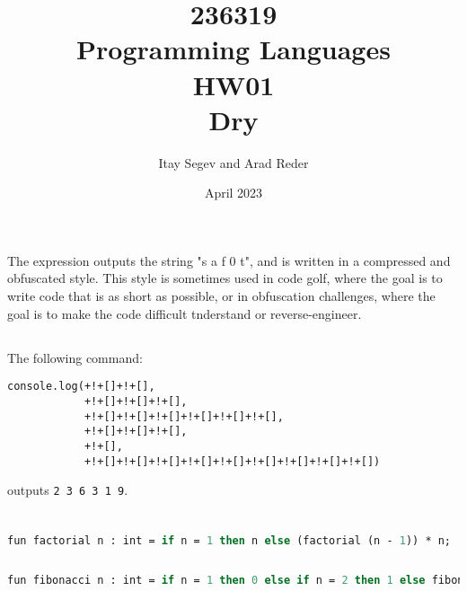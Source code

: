 \documentclass{article}
\title{%
       236319 \\
       Programming Languages \\
       \large HW01 \\
       \small Dry}
\author{Itay Segev and Arad Reder}
\date{April 2023}
\begin{document}
\maketitle

\section{}
\subsection{}
The expression outputs the string "s a f 0 t", and is written in a compressed and obfuscated style. This style is sometimes used in code
golf, where the goal is to write code that is as short as possible, or in obfuscation challenges, where the goal is to make the code difficult
tnderstand or reverse-engineer.
\subsection{}
The following command:
\begin{lstlisting}
console.log(+!+[]+!+[],
            +!+[]+!+[]+!+[],
            +!+[]+!+[]+!+[]+!+[]+!+[]+!+[],
            +!+[]+!+[]+!+[],
            +!+[],
            +!+[]+!+[]+!+[]+!+[]+!+[]+!+[]+!+[]+!+[]+!+[])
\end{lstlisting}
outputs \lstinline{2 3 6 3 1 9}.

\section{}
\subsection{}
\begin{lstlisting}[language=Pascal]
fun factorial n : int = if n = 1 then n else (factorial (n - 1)) * n;
\end{lstlisting}

\subsection{}
\begin{lstlisting}[language=Pascal]
fun fibonacci n : int = if n = 1 then 0 else if n = 2 then 1 else fibonacci(n - 1) + fibonacci(n - 2);
\end{lstlisting}

\section{}
\end{document}
